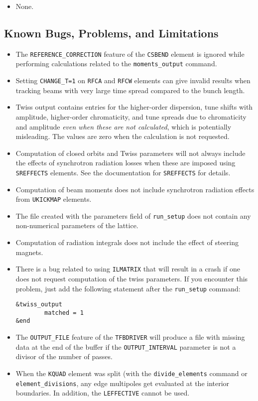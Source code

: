 \documentclass[11pt]{article}
\begin{document}
\begin{itemize}
\item None.
\end{itemize}

\subsection{Known Bugs, Problems, and Limitations}
\begin{itemize}
\item The \verb|REFERENCE_CORRECTION| feature of the \verb|CSBEND| element is ignored while performing calculations related
  to the \verb|moments_output| command.
\item Setting \verb|CHANGE_T=1| on \verb|RFCA| and \verb|RFCW| elements can give invalid results when tracking beams with very 
  large time spread compared to the bunch length.
\item Twiss output contains entries for the higher-order dispersion, tune shifts with amplitude, higher-order chromaticity, and tune spreads
  due to chromaticity and amplitude {\em even when these are not calculated}, which is potentially
  misleading.   The values are zero when the calculation is not requested.
\item Computation of closed orbits and Twiss parameters will not always include the effects of synchrotron
  radiation losses when these are imposed using {\tt SREFFECTS} elements.  See
  the documentation for {\tt SREFFECTS} for details.
\item Computation of beam moments does not include synchrotron radiation effects from \verb|UKICKMAP| elements.
\item The file created with the parameters field of \verb|run_setup| does not contain
  any non-numerical parameters of the lattice.
\item Computation of radiation integrals does not include the effect of steering magnets.
\item There is a bug related to using {\tt ILMATRIX} that will result in a crash
  if one does not request computation of the twiss parameters. If you encounter this
  problem, just add the following statement after the \verb|run_setup| command:
\begin{verbatim}
&twiss_output
        matched = 1
&end
\end{verbatim}
\item The \verb|OUTPUT_FILE| feature of the \verb|TFBDRIVER| will produce a file with missing data at the end of
  the buffer if the \verb|OUTPUT_INTERVAL| parameter is not a divisor of the number of passes.
\item When the \verb|KQUAD| element was split (with the \verb|divide_elements| command or
  \verb|element_divisions|, any edge multipoles get evaluated at the interior boundaries. In addition, the
  \verb|LEFFECTIVE| cannot be used.
\end{itemize}
\end{document}
